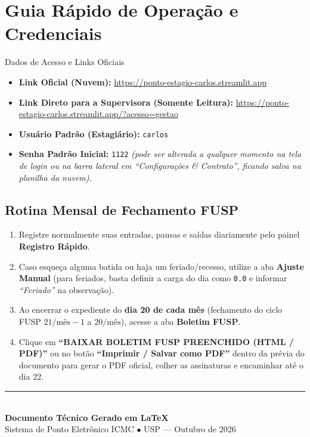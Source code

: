 \documentclass[11pt,a4paper]{article}
\begin{document}
\section{Guia Rápido de Operação e Credenciais}

\begin{warnBox}{Dados de Acesso e Links Oficiais}
\begin{itemize}[leftmargin=1.5em, itemsep=3pt]
    \item \textbf{Link Oficial (Nuvem):} \url{https://ponto-estagio-carlos.streamlit.app}
    \item \textbf{Link Direto para a Supervisora (Somente Leitura):} \url{https://ponto-estagio-carlos.streamlit.app/?acesso=gestao}
    \item \textbf{Usuário Padrão (Estagiário):} \texttt{carlos}
    \item \textbf{Senha Padrão Inicial:} \texttt{1122} \textit{(pode ser alterada a qualquer momento na tela de login ou na barra lateral em ``Configurações \& Contrato'', ficando salva na planilha da nuvem)}.
\end{itemize}
\end{warnBox}

\subsection{Rotina Mensal de Fechamento FUSP}
\begin{enumerate}[leftmargin=1.5em]
    \item Registre normalmente suas entradas, pausas e saídas diariamente pelo painel \textbf{Registro Rápido}.
    \item Caso esqueça alguma batida ou haja um feriado/recesso, utilize a aba \textbf{Ajuste Manual} (para feriados, basta definir a carga do dia como \texttt{0.0} e informar \textit{``Feriado''} na observação).
    \item Ao encerrar o expediente do \textbf{dia 20 de cada mês} (fechamento do ciclo FUSP $21/\text{mês}-1$ a $20/\text{mês}$), acesse a aba \textbf{Boletim FUSP}.
    \item Clique em \textbf{``BAIXAR BOLETIM FUSP PREENCHIDO (HTML / PDF)''} ou no botão \textbf{``Imprimir / Salvar como PDF''} dentro da prévia do documento para gerar o PDF oficial, colher as assinaturas e encaminhar até o dia 22.
\end{enumerate}

\vspace{1.0cm}
\begin{center}
\rule{0.5\linewidth}{0.4pt}\\[0.2cm]
{\small \textbf{Documento Técnico Gerado em \LaTeX}}\\
{\footnotesize Sistema de Ponto Eletrônico ICMC $\bullet$ USP --- Outubro de 2026}
\end{center}
\end{document}
